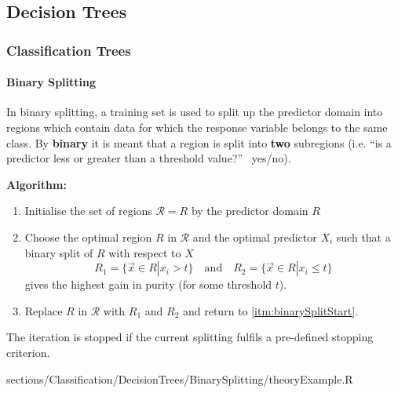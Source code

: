 \subsection{Decision Trees}
	\subsubsection{Classification Trees}	
		\paragraph{Binary Splitting}
			In binary splitting, a training set is used to split up the predictor domain into regions which contain data for which the response variable belongs to the same class. By \textbf{binary} it is meant that a region is split into \textbf{two} subregions (i.e. ``is a predictor less or greater than a threshold value?'' \textrightarrow\ yes/no).
			
			\RTheory
			{
				\textbf{Algorithm:}
				\begin{enumerate}
				  	\item Initialise the set of regions $\mathcal{R} = {R}$ by the predictor domain $R$
				  	\item\label{itm:binarySplitStart}  Choose the optimal region $R$ in $\mathcal{R}$ and the optimal predictor $X_i$ such that a binary split of $R$ with respect to $X$
						$$R_1 = \{\vec{x} \in R | x_i > t\} \quad\mathrm{and}\quad R_2 = \{\vec{x} \in R | x_i \leq t\}$$
						gives the highest gain in purity (for some threshold $t$).
					\item Replace $R$ in $\mathcal{R}$ with $R_1$ and $R_2$ and return to \ref{itm:binarySplitStart}.
				\end{enumerate}
				
				The iteration is stopped if the current splitting fulfils a pre-defined stopping criterion.
				
			}
			{
				sections/Classification/DecisionTrees/BinarySplitting/theoryExample.R
			}
			
